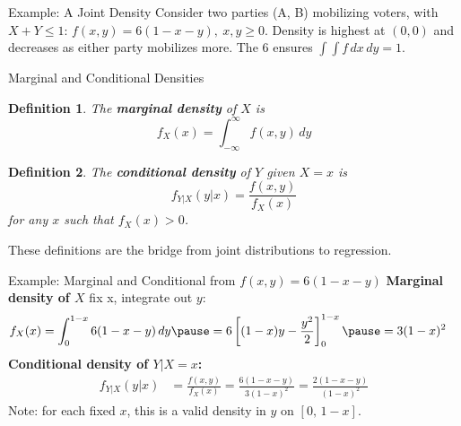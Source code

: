 \documentclass[aspectratio=169, handout, t]{beamer}
\newtheorem{defn}{Definition}
\numberwithin{equation}{section}
\begin{document}
\begin{frame}{Example: A Joint Density}
\small
Consider two parties (A, B) mobilizing voters, with $X+Y\leq 1$:
$f(x,y)=6(1 - x - y),\ x,y\geq 0.$
Density is highest at $(0,0)$ and decreases as either party mobilizes more.
The 6 ensures $\int\!\int f\,dx\,dy=1$.
\begin{center}
\end{center}
\end{frame}


\begin{frame}{Marginal and Conditional Densities}
\begin{defn}
The \textbf{marginal density} of $X$ is
$$f_X(x)=\int_{-\infty}^\infty f(x,y)\,dy$$
\end{defn}
\begin{defn}
The \textbf{conditional density} of $Y$ given $X=x$ is
$$f_{Y|X}(y|x)=\frac{f(x,y)}{f_X(x)}$$
for any $x$ such that $f_X(x)>0$.
\end{defn}
These definitions are the bridge from joint distributions to regression.
\end{frame}


\begin{frame}{Example: Marginal and Conditional from $f(x,y)=6(1-x-y)$}
\textbf{Marginal density of $X$} fix x, integrate out $y$:
\begin{align*}
f_X(x)&=\int_0^{1-x}6(1-x-y)\,dy \pause
= 6\left[(1-x)y-\frac{y^2}{2}\right]_0^{1-x} \pause
= 3(1 - x)^2
\end{align*}\pause
\textbf{Conditional density of $Y|X=x$:}
\begin{align*}
f_{Y|X}(y|x)&=\frac{f(x,y)}{f_X(x)}=\frac{6(1-x-y)}{3(1-x)^2}=\frac{2(1-x-y)}{(1-x)^2}
\end{align*}\pause
Note: for each fixed $x$, this is a valid density in $y$ on $[0,\,1-x]$.
\end{frame}



\end{document}
